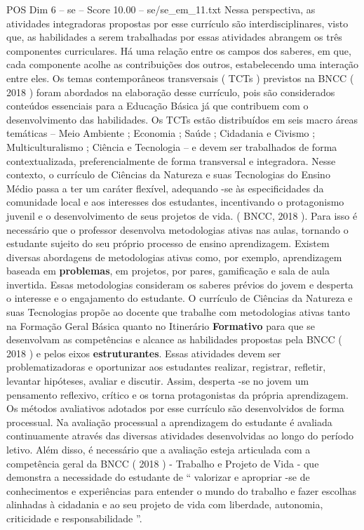 \begin{textsample}{POS Dim 6 – se – Score 10.00 – se/se\_em\_11.txt}
Nessa perspectiva, as atividades integradoras propostas por esse currículo são interdisciplinares, visto que, as habilidades a serem trabalhadas por essas atividades abrangem os três componentes curriculares.
Há uma relação entre os campos dos saberes, em que, cada componente acolhe as contribuições dos outros, estabelecendo uma interação entre eles.
Os temas contemporâneos transversais ( TCTs ) previstos na BNCC ( 2018 ) foram abordados na elaboração desse currículo, pois são considerados conteúdos essenciais para a Educação Básica já que contribuem com o desenvolvimento das habilidades.
Os TCTs estão distribuídos em seis macro áreas temáticas – Meio Ambiente ; Economia ; Saúde ; Cidadania e Civismo ; Multiculturalismo ; Ciência e Tecnologia – e devem ser trabalhados de forma contextualizada, preferencialmente de forma transversal e integradora.
Nesse contexto, o currículo de Ciências da Natureza e suas Tecnologias do Ensino Médio passa a ter um caráter flexível, adequando -se às especificidades da comunidade local e aos interesses dos estudantes, incentivando o protagonismo juvenil e o desenvolvimento de seus projetos de vida. ( BNCC, 2018 ).
Para isso é necessário que o professor desenvolva metodologias ativas nas aulas, tornando o estudante sujeito do seu próprio processo de ensino aprendizagem.
Existem diversas abordagens de metodologias ativas como, por exemplo, aprendizagem baseada em \textbf{problemas}, em projetos, por pares, gamificação e sala de aula invertida.
Essas metodologias consideram os saberes prévios do jovem e desperta o interesse e o engajamento do estudante.
O currículo de Ciências da Natureza e suas Tecnologias propõe ao docente que trabalhe com metodologias ativas tanto na Formação Geral Básica quanto no Itinerário \textbf{Formativo} para que se desenvolvam as competências e alcance as habilidades propostas pela BNCC ( 2018 ) e pelos eixos \textbf{estruturantes}.
Essas atividades devem ser problematizadoras e oportunizar aos estudantes realizar, registrar, refletir, levantar hipóteses, avaliar e discutir.
Assim, desperta -se no jovem um pensamento reflexivo, crítico e os torna protagonistas da própria aprendizagem.
Os métodos avaliativos adotados por esse currículo são desenvolvidos de forma processual.
Na avaliação processual a aprendizagem do estudante é avaliada continuamente através das diversas atividades desenvolvidas ao longo do período letivo.
Além disso, é necessário que a avaliação esteja articulada com a competência geral da BNCC ( 2018 ) - Trabalho e Projeto de Vida - que demonstra a necessidade do estudante de “ valorizar e apropriar -se de conhecimentos e experiências para entender o mundo do trabalho e fazer escolhas alinhadas à cidadania e ao seu projeto de vida com liberdade, autonomia, criticidade e responsabilidade ”.

\end{textsample}
